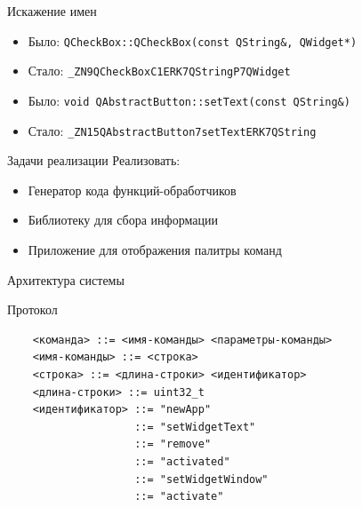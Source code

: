 \documentclass[aspectratio=1610]{beamer}
\begin{document}
\begin{frame}{Искажение имен}
	\begin{itemize}
		\item Было: \texttt{QCheckBox::QCheckBox(const QString\&, QWidget*)}
		\item Стало: \texttt{\_ZN9QCheckBoxC1ERK7QStringP7QWidget}
	\end{itemize}
	\vspace{0.7cm}
	\begin{itemize}
		\item Было: \texttt{void QAbstractButton::setText(const QString\&)}
		\item Стало: \texttt{\_ZN15QAbstractButton7setTextERK7QString}
	\end{itemize}
\end{frame}

\begin{frame}{Задачи реализации}
	Реализовать:
	\begin{itemize}
		\item Генератор кода функций-обработчиков
		\item Библиотеку для сбора информации
		\item Приложение для отображения палитры команд
	\end{itemize}
\end{frame}

\begin{frame}{Архитектура системы}
	\begin{figure}
		\centering
		
	\end{figure}
\end{frame}

\begin{frame}[fragile]{Протокол}
	\begin{verbatim}
    <команда> ::= <имя-­команды> <параметры-­команды>
    <имя-­команды> ::= <строка>
    <строка> ::= <длина-­строки> <идентификатор>
    <длина-­строки> ::= uint32_t
    <идентификатор> ::= "newApp"
                    ::= "setWidgetText"
                    ::= "remove"
                    ::= "activated"
                    ::= "setWidgetWindow"
                    ::= "activate"
	\end{verbatim}
\end{frame}

\end{document}

